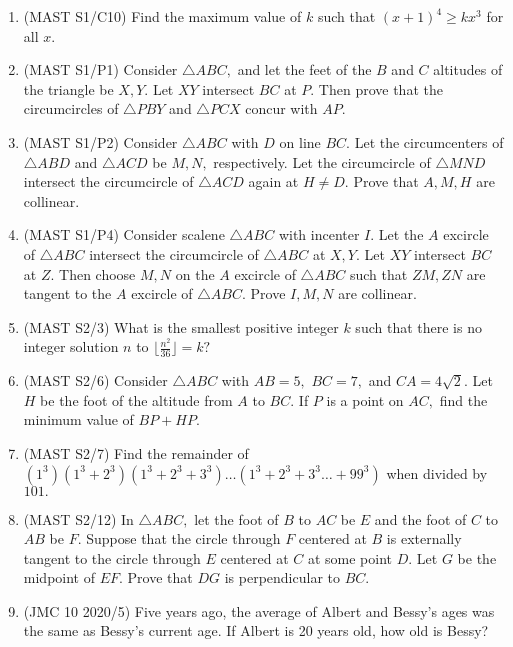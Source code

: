 \documentclass{article}
\begin{document}
\begin{enumerate}
\item (MAST S1/C10) Find the maximum value of $k$ such that $(x+1)^4\geq kx^3$ for all $x.$

\item (MAST S1/P1) Consider $\triangle ABC,$ and let the feet of the $B$ and $C$ altitudes of the triangle be $X,Y.$ Let $XY$ intersect $BC$ at $P.$ Then prove that the circumcircles of $\triangle PBY$ and $\triangle PCX$ concur with $AP.$

\item (MAST S1/P2) Consider $\triangle ABC$ with $D$ on line $BC.$ Let the circumcenters of $\triangle ABD$ and $\triangle ACD$ be $M,N,$ respectively. Let the circumcircle of $\triangle MND$ intersect the circumcircle of $\triangle ACD$ again at $H\neq D.$ Prove that $A,M,H$ are collinear.

\item (MAST S1/P4) Consider scalene $\triangle ABC$ with incenter $I.$ Let the $A$ excircle of $\triangle ABC$ intersect the circumcircle of $\triangle ABC$ at $X,Y.$ Let $XY$ intersect $BC$ at $Z.$ Then choose $M,N$ on the $A$ excircle of $\triangle ABC$ such that $ZM,ZN$ are tangent to the $A$ excircle of $\triangle ABC.$ Prove $I,M,N$ are collinear.

\item (MAST S2/3) What is the smallest positive integer $k$ such that there is no integer solution $n$ to $\lfloor \frac{n^2}{36}\rfloor=k?$

\item (MAST S2/6) Consider $\triangle ABC$ with $AB=5,$ $BC=7,$ and $CA=4\sqrt{2}.$ Let $H$ be the foot of the altitude from $A$ to $BC.$ If $P$ is a point on $AC,$ find the minimum value of $BP+HP.$

\item (MAST S2/7) Find the remainder of $(1^3)(1^3+2^3)(1^3+2^3+3^3)\dots(1^3+2^3+3^3\dots+99^3)$ when divided by $101.$

\item (MAST S2/12) In $\triangle ABC,$ let the foot of $B$ to $AC$ be $E$ and the foot of $C$ to $AB$ be $F.$ Suppose that the circle through $F$ centered at $B$ is externally tangent to the circle through $E$ centered at $C$ at some point $D.$ Let $G$ be the midpoint of $EF.$ Prove that $DG$ is perpendicular to $BC.$

\item (JMC 10 2020/5) Five years ago, the average of Albert and Bessy's ages was the same as Bessy's current age. If Albert is 20 years old, how old is Bessy?


\end{enumerate}
\end{document}

